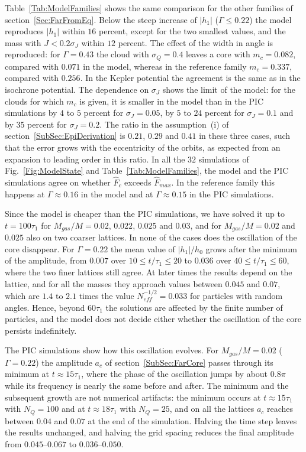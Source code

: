 Table~\ref{Tab:ModelFamilies} shows the same comparison for the other families of section~\ref{Sec:FarFromEq}. Below the steep increase of $|h_1|$ ($\Gamma\leq 0.22$) the model reproduces $|h_1|$ within $16$ percent, except for the two smallest values, and the mass with $J < 0.2\sigma_J$ within $12$ percent. The effect of the width in angle is reproduced: for $\Gamma = 0.43$ the cloud with $\sigma_Q = 0.4$ leaves a core with $m_c = 0.082$, compared with $0.071$ in the model, whereas in the reference family $m_c = 0.337$, compared with $0.256$. In the Kepler potential the agreement is the same as in the isochrone potential. The dependence on $\sigma_J$ shows the limit of the model: for the clouds for which $m_c$ is given, it is smaller in the model than in the PIC simulations by $4$ to $5$ percent for $\sigma_J = 0.05$, by $5$ to $24$ percent for $\sigma_J = 0.1$ and by $35$ percent for $\sigma_J = 0.2$. The ratio in the assumption~(i) of section~\ref{SubSec:EpiDerivation} is $0.21$, $0.29$ and $0.41$ in these three cases, such that the error grows with the eccentricity of the orbits, as expected from an expansion to leading order in this ratio. In all the $32$ simulations of Fig.~\ref{Fig:ModelState} and Table~\ref{Tab:ModelFamilies}, the model and the PIC simulations agree on whether $\hat{F}_c$ exceeds $\hat{F}_{max}$. In the reference family this happens at $\Gamma\approx 0.16$ in the model and at $\Gamma\approx 0.15$ in the PIC simulations.

Since the model is cheaper than the PIC simulations, we have solved it up to $t = 100\tau_1$ for $M_{gas}/M = 0.02$, $0.022$, $0.025$ and $0.03$, and for $M_{gas}/M = 0.02$ and $0.025$ also on two coarser lattices. In none of the cases does the oscillation of the core disappear. For $\Gamma = 0.22$ the mean value of $|h_1|/h_0$ grows after the minimum of the amplitude, from $0.007$ over $10\leq t/\tau_1\leq 20$ to $0.036$ over $40\leq t/\tau_1\leq 60$, where the two finer lattices still agree. At later times the results depend on the lattice, and for all the masses they approach values between $0.045$ and $0.07$, which are $1.4$ to $2.1$ times the value $N_{eff}^{-1/2} = 0.033$ for particles with random angles. Hence, beyond $60\tau_1$ the solutions are affected by the finite number of particles, and the model does not decide either whether the oscillation of the core persists indefinitely.

The PIC simulations show how this oscillation evolves. For $M_{gas}/M = 0.02$ ($\Gamma = 0.22$) the amplitude $a_c$ of section~\ref{SubSec:FarCore} passes through its minimum at $t\approx 15\tau_1$, where the phase of the oscillation jumps by about $0.8\pi$ while its frequency is nearly the same before and after. The minimum and the subsequent growth are not numerical artifacts: the minimum occurs at $t\approx 15\tau_1$ with $N_Q = 100$ and at $t\approx 18\tau_1$ with $N_Q = 25$, and on all the lattices $a_c$ reaches between $0.04$ and $0.07$ at the end of the simulation. Halving the time step leaves the results unchanged, and halving the grid spacing reduces the final amplitude from $0.045$--$0.067$ to $0.036$--$0.050$.


